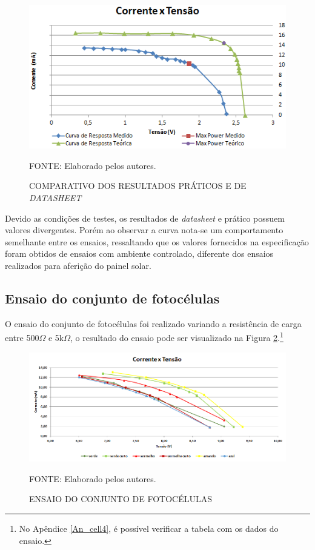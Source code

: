 \documentclass[
	12pt,				%
	openright,			%
	oneside,			%
	a4paper,			%
	english,			%
	french,				%
	spanish,			%
	brazil,				%
	oldfontcommands
	]{abntex2}
\begin{document}
	\begin{figure}[th]
		\caption{COMPARATIVO DOS RESULTADOS PRÁTICOS E DE \textit{DATASHEET}}
		\centering
		\label{Fig_ens_cell}
		\includegraphics[width=0.7\linewidth]{./figs/ens_cell}
		
		\begin{small}
			FONTE: Elaborado pelos autores.
		\end{small}	
	\end{figure}

	Devido as condições de testes, os resultados de \textit{datasheet} e prático possuem valores divergentes. Porém ao observar a curva nota-se um comportamento semelhante entre os ensaios, ressaltando que os valores fornecidos na especificação foram obtidos de ensaios com ambiente controlado, diferente dos ensaios realizados para aferição do painel solar.
	
	
\subsection[Ensaio do conjunto de fotocélulas]{Ensaio do conjunto de fotocélulas}

	O ensaio do conjunto de fotocélulas foi realizado variando a resistência de carga entre 500$\Omega$ e 5k$\Omega$, o resultado do ensaio pode ser visualizado na Figura \ref{Fig_ens_cell4}.\footnote{No Apêndice \ref{An_cell4}, é possível verificar a tabela com os dados do ensaio.} 
	
	\begin{figure}[th]
		\caption{ENSAIO DO CONJUNTO DE FOTOCÉLULAS}
		\centering
		\label{Fig_ens_cell4}
		\includegraphics[width=1.0\linewidth]{./figs/ens_cell4}
		
		\begin{small}
			FONTE: Elaborado pelos autores.
		\end{small}	
	\end{figure}
	
\end{document}
